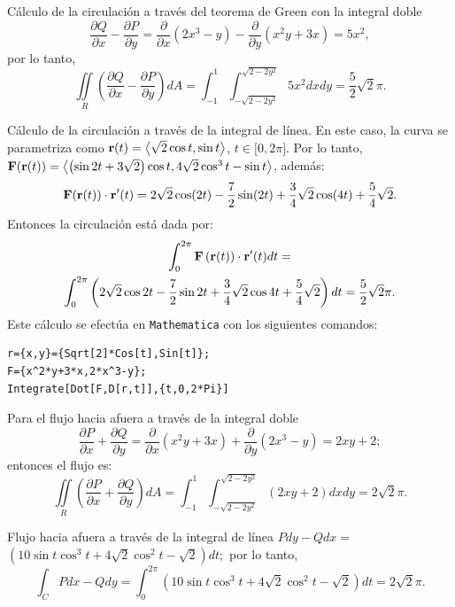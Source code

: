 \begin{parrafoitemize}
\item Cálculo de la circulación a través del teorema de Green con la integral doble
\[\frac{\partial Q}{\partial x}-\frac{\partial P}{\partial y}=\frac{\partial }{\partial x}\left( 2x^{3}-y\right)-
\frac{\partial }{\partial y}\left( x^{2}y+3x\right) = 5x^{2},\]
por lo tanto,
\[\iint\limits_{R}\left( \frac{\partial Q}{\partial x}-\frac{\partial P}{\partial y}\right) dA=\int_{-1}^{1}\int_{-\sqrt{2-2y^{2}} }^{\sqrt{2-2y^{2}} }5x^{2}dxdy= \frac{5}{2}\sqrt{2}\pi.\]
\item Cálculo de la circulación a través de la integral de línea. En este caso, la curva se parametriza como
${\bf r}(t) =\left\langle \sqrt{2}\cos t,\sin t\right\rangle $, $t\in \lbrack 0,2\pi ]$.
Por lo tanto, ${\bf F}({\bf r}(t))=\left\langle \left( \sin 2t+3\sqrt{2}\right) \cos t,4\sqrt{2}\cos ^{3}t-\sin t\right\rangle$, además:
\[{\bf F}({\bf r}(t))\cdot{\bf r}^{\prime}(t)=2\sqrt{2}\cos(2t)-\frac{7}{2}\sin(2t)+\frac{3}{4}\sqrt{2}\cos(4t)+\frac{5}{4}\sqrt{2}.\] Entonces la circulación está dada por:
\begin{multline*} \int_{0}^{2\pi}{\bf F}\left({\bf r}(t)\right)\cdot{\bf r}^{\prime}(t) dt = \\ \int_{0}^{2\pi}\left( 2\sqrt{2}\cos 2t-\frac{7}{2}\sin 2t+\frac{3}{4}\sqrt{2}\cos 4t+\frac{5}{4}\sqrt{2}\right) dt
= \frac{5}{2}\sqrt{2}\pi.
\end{multline*}
Este cálculo se efectúa en \verb"Mathematica" con los siguientes comandos:

\begin{tcolorbox}[title=\bf Instrucción \verb"Mathematica"]\begin{Verbatim}[formatcom=\letraverbatim]
r={x,y}={Sqrt[2]*Cos[t],Sin[t]};
F={x^2*y+3*x,2*x^3-y};
Integrate[Dot[F,D[r,t]],{t,0,2*Pi}]
\end{Verbatim}
\end{tcolorbox}

\item Para el flujo hacia afuera a través de la integral doble
\[\frac{\partial P}{\partial x}+\frac{\partial Q}{\partial y}=\frac{\partial }{\partial x}\left( x^{2}y+3x\right) +\frac{\partial }{\partial y}\left(2x^{3}-y\right) = 2xy+2;\]
entonces el flujo es:
\[\iint\limits_{R}\left(\frac{\partial P}{\partial x}+\frac{\partial Q}{\partial y}\right)dA = \int_{-1}^{1}\int_{-\sqrt{2-2y^{2}}}^{\sqrt{2-2y^{2}} }\left( 2xy+2\right) dxdy= 2\sqrt{2}\pi.\]

\item Flujo hacia afuera a través de la integral de línea
$Pdy-Qdx=$ $\left( 10\sin t\cos ^{3}t+4\sqrt{2}\cos ^{2}t-\sqrt{2}\right) dt;$
por lo tanto,
\[\int_{C}Pdx-Qdy=\int_{0}^{2\pi }\left( 10\sin t\cos ^{3}t+4\sqrt{2}\cos ^{2}t-\sqrt{2}\right) dt= 2\sqrt{2}\pi.\]
\end{parrafoitemize}

